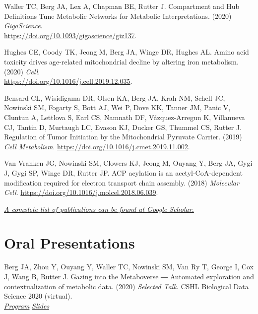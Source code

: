 \documentclass[margin,line]{res}
\begin{document}
\begin{resume}
Waller TC, Berg JA, Lex A, Chapman BE, Rutter J. Compartment and Hub Definitions Tune Metabolic Networks for Metabolic Interpretations. (2020) \textit{GigaScience}. \\ \href{https://academic.oup.com/gigascience/article/9/1/giz137/5714891}{https://doi.org/10.1093/gigascience/giz137}.

Hughes CE, Coody TK, Jeong M, Berg JA, Winge DR, Hughes AL. Amino acid toxicity drives age-related mitochondrial decline by altering iron metabolism. (2020) \textit{Cell}. \\
\href{https://www.sciencedirect.com/science/article/pii/S0092867419313972?via\%3Dihub}{https://doi.org/10.1016/j.cell.2019.12.035}.

Bensard CL, Wisidigama DR, Olsen KA, Berg JA, Krah NM, Schell JC, Nowinski SM, Fogarty S, Bott AJ, Wei P, Dove KK, Tanner JM, Panic V, Cluntun A, Lettlova S, Earl CS, Namnath DF, Vázquez-Arregun K, Villanueva CJ, Tantin D, Murtaugh LC, Evason KJ, Ducker GS, Thummel CS, Rutter J. Regulation of Tumor Initiation by the Mitochondrial Pyruvate Carrier. (2019) \textit{Cell Metabolism}. \href{https://www.sciencedirect.com/science/article/pii/S1550413119306096}{https://doi.org/10.1016/j.cmet.2019.11.002}.

Van Vranken JG, Nowinski SM, Clowers KJ, Jeong M, Ouyang Y, Berg JA, Gygi J, Gygi SP, Winge DR, Rutter JP. ACP acylation is an acetyl-CoA-dependent modification required for electron transport chain assembly. (2018) \textit{Molecular Cell}. \href{https://www.sciencedirect.com/science/article/pii/S1097276518305148}{https://doi.org/10.1016/j.molcel.2018.06.039}.

 \href{https://scholar.google.com/citations?user=0XsLZ3sAAAAJ&hl=en}{\textit{\small{A complete list of publications can be found at Google Scholar.}}}


\section{\sc Oral Presentations}
Berg JA, Zhou Y, Ouyang Y, Waller TC, Nowinski SM, Van Ry T, George I, Cox J, Wang B, Rutter J. Gazing into the Metaboverse ― Automated exploration and contextualization of metabolic data. (2020) \textit{Selected Talk}. CSHL Biological Data Science 2020 (virtual). \\
\hspace*{12pt} \textit{\href{https://meetings.cshl.edu/abstracts.aspx?meet=data&year=20}{Program}}
\hspace*{12pt} \textit{\href{https://github.com/j-berg/presentations/tree/master/CSHL_BiologicalDataScience_2020}{Slides}}


\end{resume}
\end{document}
